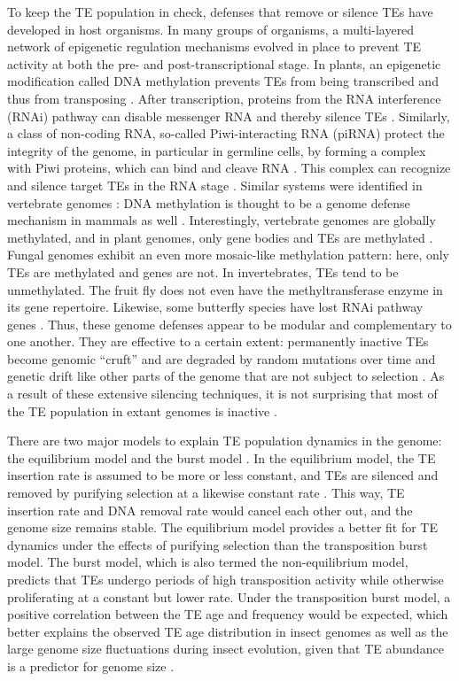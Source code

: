To keep the TE population in check, defenses that remove or silence TEs
have developed in host organisms. In many groups of organisms, a
multi-layered network of epigenetic regulation mechanisms evolved in
place to prevent TE activity at both the pre- and post-transcriptional
stage. In plants, an epigenetic modification called DNA methylation
prevents TEs from being transcribed and thus from transposing
\citep{Slotkin2007, Lisch2009}. After transcription, proteins from the
RNA interference (RNAi) pathway can disable messenger RNA and thereby
silence TEs \citep{Buchon2006}. Similarly, a class of non-coding RNA,
so-called Piwi-interacting RNA (piRNA) protect the integrity of the
genome, in particular in germline cells, by forming a complex with Piwi
proteins, which can bind and cleave RNA \citep{Zeng2011}. This complex
can recognize and silence target TEs in the RNA stage \citep{Siomi2011,
Mondal2018}.  Similar systems were identified in vertebrate genomes
\citep{Suzuki2008, Schubeler2015}: DNA methylation is thought to be a
genome defense mechanism in mammals as well \citep{Yoder1997}.
Interestingly, vertebrate genomes are globally methylated, and in plant
genomes, only gene bodies and TEs are methylated \citep{Suzuki2008}.
Fungal genomes exhibit an even more mosaic-like methylation pattern:
here, only TEs are methylated and genes are not. In invertebrates, TEs
tend to be unmethylated. The fruit fly 
does not even have the methyltransferase enzyme in its gene repertoire. Likewise, some
butterfly species have lost RNAi pathway genes \citep{Pauli2016}. Thus,
these genome defenses appear to be modular and complementary to one
another. They are effective to a certain extent: permanently inactive
TEs become genomic ``cruft'' and are degraded by random mutations over
time and genetic drift like other parts of the genome that are not
subject to selection \citep{Szitenberg2016}. As a result of these
extensive silencing techniques, it is not surprising that most of the TE
population in extant genomes is inactive \citep{Yoder1997,
Zilberman2007}.

There are two major models to explain TE population dynamics in the
genome: the equilibrium model and the burst model \citep{Petrov2011,
Kofler2012, Cridland2013, Blumenstiel2014}. In the equilibrium model,
the TE insertion rate is assumed to be more or less constant, and TEs
are silenced and removed by purifying selection at a likewise constant
rate \citep{Charlesworth1983}. This way, TE insertion rate and DNA
removal rate would cancel each other out, and the genome size remains
stable.  The equilibrium model provides a better fit for TE dynamics
under the effects of purifying selection \citep{Barron2014} than the
transposition burst model. The burst model, which is also termed the
non-equilibrium model, predicts that TEs undergo periods of high
transposition activity while otherwise proliferating at a constant but
lower rate. Under the transposition burst model, a positive correlation
between the TE age and frequency would be expected, which better
explains the observed TE age distribution in insect genomes as well as
the large genome size fluctuations during insect evolution, given that
TE abundance is a predictor for genome size \citep{Alfsnes2017,
Petersen2018a}.

